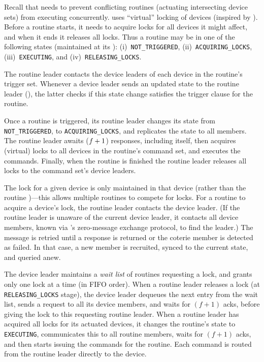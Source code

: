 {
Recall that \sysname{} needs to prevent conflicting routines (actuating intersecting device sets) from executing concurrently. 
\sysname{} uses ``virtual'' locking of devices (inspired by \cite{Safehome}). Before a routine starts, it needs to acquire locks for all devices it might affect, and when it ends it releases all locks.} 
Thus a routine may be in one of the following states (maintained at its \kgroup): 
(i)~\texttt{NOT\_TRIGGERED}, (ii)~\texttt{ACQUIRING\_LOCKS},
(iii)~\texttt{EXECUTING}, and  (iv)~\texttt{RELEASING\_LOCKS}. 

The routine leader contacts the device leaders of each device in the routine's trigger set.  Whenever a device leader sends an updated state to the routine leader (), the latter checks if this state change satisfies the trigger clause for the routine.

Once a routine is triggered, its routine leader changes its state from  \texttt{NOT\_TRIGGERED}, to  \texttt{ACQUIRING\_LOCKS}, and replicates the state to
all \kgroup{} members. The routine leader awaits ($f + 1$) responses, including itself, then
acquires (virtual) locks to all devices in the routine's command set, and executes the commands. Finally, when the routine is finished the routine leader releases all locks to the command set's device leaders. 

The lock for a given device is only maintained in that device \kgroup{} (rather than the routine \kgroup)---this allows multiple routines to compete for locks. For a routine to acquire a device's lock, the routine leader contacts the device leader. (If the routine leader is unaware of the current device leader, it contacts all device \kgroup{} members,  known via  's
zero-message exchange protocol, to find the leader.) 
The message is retried until a response is returned or the coterie member is detected as failed. In that case, a new member is recruited, synced to the current state, and queried anew.

The device leader maintains a {\it wait list} of routines requesting a lock, and grants only one lock at a time (in FIFO order). When a routine leader releases a lock  (at  \texttt{RELEASING\_LOCKS} stage), the device leader dequeues the next entry from the wait list, sends a request to all its device \kgroup{} members, and waits for $(f+1)$ acks, before giving the lock to this requesting routine leader.
When a routine leader has acquired all locks for its actuated devices, it changes the routine's state to \texttt{EXECUTING}, communicates this to all routine \kgroup{} members, waits for $(f+1)$ acks,
and then starts issuing the commands for the routine. 
{Each command is routed from the routine leader 
directly 
to the device. } 

